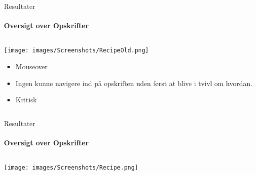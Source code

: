 \begin{frame}{Resultater}
\framesubtitle{Oversigt over Opskrifter}

	
	\begin{minipage}[0.3\textheight]{\textwidth}
	\begin{columns}[T]
	\begin{column}{1\textwidth}
	 \texttt{[image: images/Screenshots/RecipeOld.png]}
	 
	 	\begin{itemize}
	 	\item Mouseover
	 	\item Ingen kunne navigere ind på opskriften uden først at blive i tvivl om hvordan.
	 	\item Kritisk
	 	
	 	\end{itemize}
	
	\end{column}

	\end{columns}

  \end{minipage}
	
\end{frame}

\begin{frame}{Resultater}
\framesubtitle{Oversigt over Opskrifter}

	
	\begin{minipage}[0.3\textheight]{\textwidth}
	\begin{columns}[T]
	\begin{column}{1\textwidth}
	 \texttt{[image: images/Screenshots/Recipe.png]}
	
	\end{column}

	\end{columns}

  \end{minipage}
	
\end{frame}

